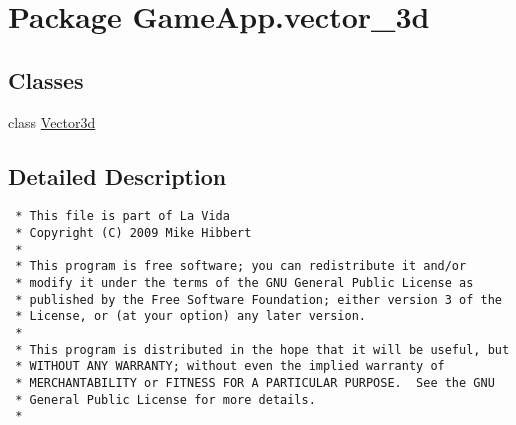 \hypertarget{namespaceGameApp_1_1vector__3d}{
\section{Package GameApp.vector\_\-3d}
\label{namespaceGameApp_1_1vector__3d}
}


\subsection*{Classes}
\begin{CompactItemize}
\item 
class \hyperlink{classGameApp_1_1vector__3d_1_1Vector3d}{Vector3d}
\end{CompactItemize}


\subsection{Detailed Description}


\footnotesize\begin{verbatim}
 * This file is part of La Vida
 * Copyright (C) 2009 Mike Hibbert
 *
 * This program is free software; you can redistribute it and/or
 * modify it under the terms of the GNU General Public License as
 * published by the Free Software Foundation; either version 3 of the
 * License, or (at your option) any later version.
 *
 * This program is distributed in the hope that it will be useful, but
 * WITHOUT ANY WARRANTY; without even the implied warranty of
 * MERCHANTABILITY or FITNESS FOR A PARTICULAR PURPOSE.  See the GNU
 * General Public License for more details.
 *
\end{verbatim}
\normalsize
 